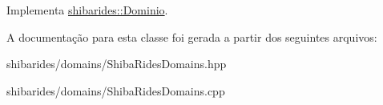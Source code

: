Implementa \hyperlink{classshibarides_1_1Dominio_acc9445531455c072bbf708709aebbe55}{shibarides\+::\+Dominio}.



A documentação para esta classe foi gerada a partir dos seguintes arquivos\+:\begin{DoxyCompactItemize}
\item 
shibarides/domains/Shiba\+Rides\+Domains.\+hpp\item 
shibarides/domains/Shiba\+Rides\+Domains.\+cpp\end{DoxyCompactItemize}
